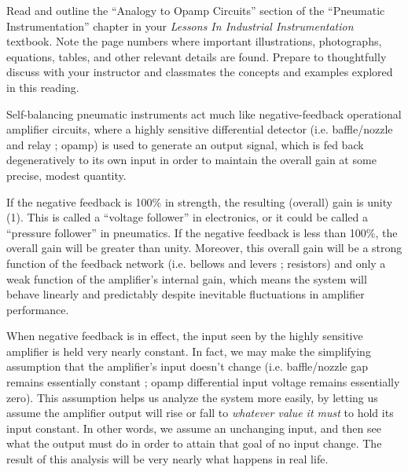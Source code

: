 

Read and outline the ``Analogy to Opamp Circuits'' section of the ``Pneumatic Instrumentation'' chapter in your {\it Lessons In Industrial Instrumentation} textbook.  Note the page numbers where important illustrations, photographs, equations, tables, and other relevant details are found.  Prepare to thoughtfully discuss with your instructor and classmates the concepts and examples explored in this reading.














Self-balancing pneumatic instruments act much like negative-feedback operational amplifier circuits, where a highly sensitive differential detector (i.e. baffle/nozzle and relay ; opamp) is used to generate an output signal, which is fed back degeneratively to its own input in order to maintain the overall gain at some precise, modest quantity.

\vskip 10pt

If the negative feedback is 100\% in strength, the resulting (overall) gain is unity (1).  This is called a ``voltage follower'' in electronics, or it could be called a ``pressure follower'' in pneumatics.  If the negative feedback is less than 100\%, the overall gain will be greater than unity.  Moreover, this overall gain will be a strong function of the feedback network (i.e. bellows and levers ; resistors) and only a weak function of the amplifier's internal gain, which means the system will behave linearly and predictably despite inevitable fluctuations in amplifier performance.

\vskip 10pt

When negative feedback is in effect, the input seen by the highly sensitive amplifier is held very nearly constant.  In fact, we may make the simplifying assumption that the amplifier's input doesn't change (i.e. baffle/nozzle gap remains essentially constant ; opamp differential input voltage remains essentially zero).  This assumption helps us analyze the system more easily, by letting us assume the amplifier output will rise or fall to {\it whatever value it must} to hold its input constant.  In other words, we assume an unchanging input, and then see what the output must do in order to attain that goal of no input change.  The result of this analysis will be very nearly what happens in real life.

